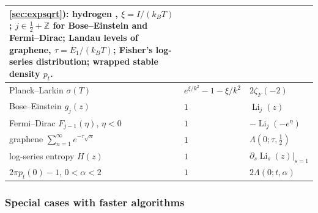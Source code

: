 \documentclass[11pt,reqno]{amsart}
\theoremstyle{definition}
\theoremstyle{remark}
\newcommand{\Li}{\operatorname{Li}}
\newcommand{\ZZ}{\mathbb{Z}}
\begin{document}
\begin{table}[p]
\begin{tabular*}{\textwidth}{@{\extracolsep{\fill}}lll@{}}
{\ref{sec:expsqrt}): hydrogen \cite{EKR11}, $\xi = I/(k_BT)$; $j \in \frac12 + \ZZ$ for Bose--Einstein and Fermi--Dirac;
Landau levels of graphene, $\tau = E_1/(k_BT)$; Fisher's log-series distribution; wrapped stable density $p_t$.} \\
\midrule
Planck--Larkin $\sigma(T)$ & $e^{\xi/k^2} - 1 - \xi/k^2$ & $2\zeta_F(-2)$ \\
Bose--Einstein $g_{j}(z)$ & $1$ & $\Li_j(z)$ \\
Fermi--Dirac $F_{j-1}(\eta)$, $\eta < 0$ & $1$ & $-\Li_j(-e^\eta)$ \\
graphene $\sum_{n=1}^{\infty}e^{-\tau\sqrt n}$ & $1$ & $\Lambda(0;\tau,\frac12)$ \\
log-series entropy $H(z)$ & $1$ & $\partial_s\Li_s(z)|_{s=1}$ \\
$2\pi p_t(0) - 1$, $0 < \alpha < 2$ & $1$ & $2\Lambda(0;t,\alpha)$ \\
\bottomrule
\end{tabular*}
\end{table}



\subsubsection{Special cases with faster algorithms}
\end{document}
